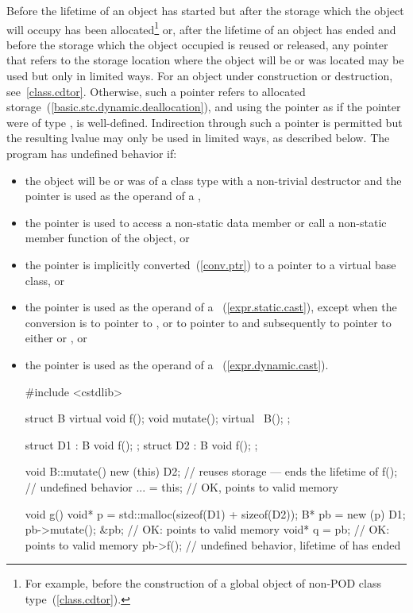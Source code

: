 \pnum
Before the lifetime of an object has started but after the storage which
the object will occupy has been allocated\footnote{For example, before the
construction of a global object of
non-POD class type~(\ref{class.cdtor}).}
or, after the lifetime of an object has ended and before the storage
which the object occupied is reused or released, any pointer that refers
to the storage location where the object will be or was located may be
used but only in limited ways.
For an object under construction or destruction, see~\ref{class.cdtor}.
Otherwise, such
a pointer refers to allocated
storage~(\ref{basic.stc.dynamic.deallocation}), and using the pointer as
if the pointer were of type , is
well-defined. Indirection through such a pointer is permitted but the resulting lvalue may only be used in
limited ways, as described below. The
program has undefined behavior if:

\begin{itemize}
\item the object will be or was of a class type with a non-trivial destructor
and the pointer is used as the operand of a ,

\item the pointer is used to access a non-static data member or call a
non-static member function of the object, or

\item the pointer is implicitly converted~(\ref{conv.ptr}) to a pointer
to a virtual base class, or

\item the pointer is used as the operand of a
~(\ref{expr.static.cast}), except when the conversion
is to pointer to  , or to pointer to 
 and subsequently to pointer to either 
 or  , or

\item the pointer is used as the operand of a
~(\ref{expr.dynamic.cast}). \enterexample

\begin{codeblock}
#include <cstdlib>

struct B {
  virtual void f();
  void mutate();
  virtual ~B();
};

struct D1 : B { void f(); };
struct D2 : B { void f(); };

void B::mutate() {
  new (this) D2;    // reuses storage --- ends the lifetime of 
  f();              // undefined behavior
  ... = this;       // OK,  points to valid memory
}

void g() {
  void* p = std::malloc(sizeof(D1) + sizeof(D2));
  B* pb = new (p) D1;
  pb->mutate();
  &pb;              // OK:  points to valid memory
  void* q = pb;     // OK:  points to valid memory
  pb->f();          // undefined behavior, lifetime of  has ended
}
\end{codeblock}
\exitexample
\end{itemize}

